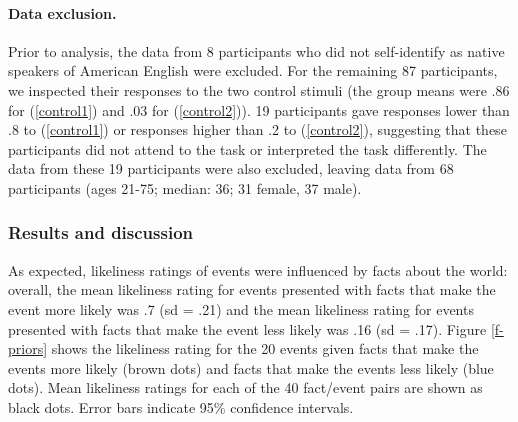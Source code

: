 \documentclass[11pt,fleqn]{article}
\newcommand{\6}{\mbox{$[\hspace*{-.6mm}[$}}
\newcommand{\9}{\mbox{$]\hspace*{-.6mm}]$}}
\begin{document}
\paragraph{Data exclusion.}
Prior to analysis, the data from 8 participants who did not self-identify as native speakers of American English were excluded. For the remaining 87 participants, we inspected their responses to the two control stimuli (the group means were .86 for (\ref{control1}) and .03 for (\ref{control2})). 19 participants gave responses lower than .8 to (\ref{control1}) or responses higher than .2 to (\ref{control2}), suggesting that these participants did not attend to the task or interpreted the task differently. The data from these 19 participants were also excluded, leaving data from 68 participants (ages 21-75; median: 36; 31 female, 37 male).  



\subsubsection{Results and discussion}

As expected, likeliness ratings of events were influenced by facts about the world: overall, the mean likeliness rating for events presented with facts that make the event more likely was .7 (sd = .21) and the mean likeliness rating for events presented with facts that make the event less likely was .16 (sd = .17). Figure \ref{f-priors} shows the likeliness rating for the 20 events given facts that make the events more likely (brown dots) and facts that make the events less likely (blue dots). Mean likeliness ratings for each of the 40 fact/event pairs are shown as black dots. Error bars indicate 95\% confidence intervals.
\end{document}
